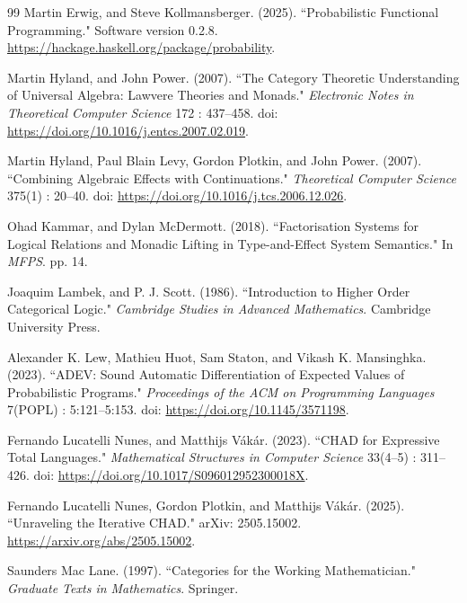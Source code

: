 \documentclass[11pt,a4paper]{article}
\theoremstyle{definition}
\theoremstyle{remark}
\begin{document}
\begin{thebibliography}{99}
Martin Erwig, and Steve Kollmansberger. (2025). ``Probabilistic Functional Programming." Software version 0.2.8. \url{https://hackage.haskell.org/package/probability}.

Martin Hyland, and John Power. (2007). ``The Category Theoretic Understanding of Universal Algebra: Lawvere Theories and Monads." \emph{Electronic Notes in Theoretical Computer Science} 172 : 437--458. doi: \url{https://doi.org/10.1016/j.entcs.2007.02.019}.

Martin Hyland, Paul Blain Levy, Gordon Plotkin, and John Power. (2007). ``Combining Algebraic Effects with Continuations." \emph{Theoretical Computer Science} 375(1) : 20--40. doi: \url{https://doi.org/10.1016/j.tcs.2006.12.026}.

Ohad Kammar, and Dylan McDermott. (2018). ``Factorisation Systems for Logical Relations and Monadic Lifting in Type-and-Effect System Semantics." In \emph{MFPS}. pp. 14.

Joaquim Lambek, and P. J. Scott. (1986). ``Introduction to Higher Order Categorical Logic." \emph{Cambridge Studies in Advanced Mathematics}. Cambridge University Press.

Alexander K. Lew, Mathieu Huot, Sam Staton, and Vikash K. Mansinghka. (2023). ``ADEV: Sound Automatic Differentiation of Expected Values of Probabilistic Programs." \emph{Proceedings of the ACM on Programming Languages} 7(POPL) : 5:121--5:153. doi: \url{https://doi.org/10.1145/3571198}.

Fernando Lucatelli Nunes, and Matthijs Vákár. (2023). ``CHAD for Expressive Total Languages." \emph{Mathematical Structures in Computer Science} 33(4--5) : 311--426. doi: \url{https://doi.org/10.1017/S096012952300018X}.

Fernando Lucatelli Nunes, Gordon Plotkin, and Matthijs Vákár. (2025). ``Unraveling the Iterative CHAD." arXiv: 2505.15002. \url{https://arxiv.org/abs/2505.15002}.

Saunders Mac Lane. (1997). ``Categories for the Working Mathematician." \emph{Graduate Texts in Mathematics}. Springer.


\end{thebibliography}
\end{document}

